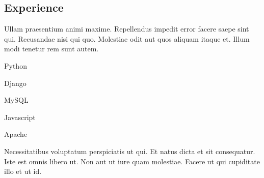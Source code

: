 \documentclass{linderothcv}
\begin{document}
\begin{lcvrightcolumn}

\section{Experience}


Ullam praesentium animi maxime. Repellendus impedit error facere saepe sint
qui. Recusandae nisi qui quo. Molestiae odit aut quos aliquam itaque et. Illum
modi tenetur rem sunt autem.

\begin{lcvitemize}[columns=5]
    \item[] Python
    \item[] Django
    \item[] MySQL
    \item[] Javascript
    \item[] Apache
\end{lcvitemize}


Necessitatibus voluptatum perspiciatis ut qui. Et natus dicta et sit
consequatur. Iste est omnis libero ut. Non aut ut iure quam molestiae. Facere
ut qui cupiditate illo et ut id.

\end{lcvrightcolumn}
\end{document}
